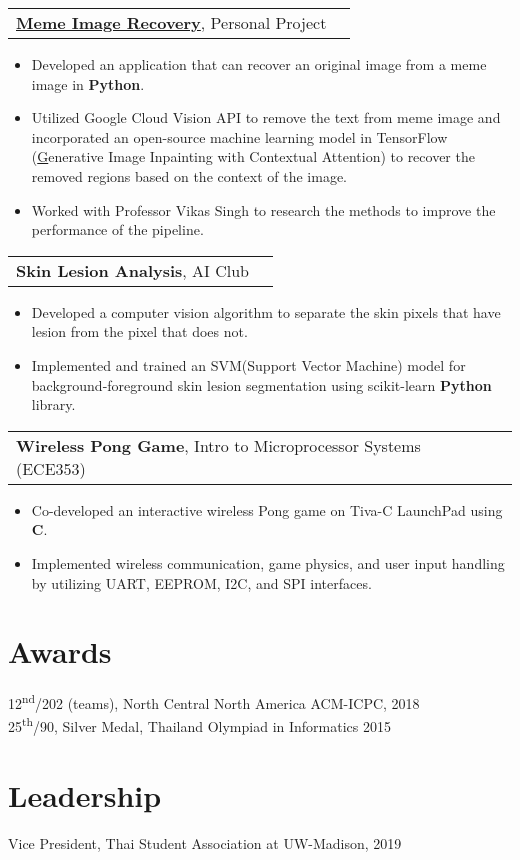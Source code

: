 \documentclass[letterpaper,11pt]{article}
\makeatletter
\newcommand{\resumeSubHeadingListStart}{\begin{itemize}[leftmargin=*,label={}]}
\newcommand{\resumeSubHeadingListEnd}{\end{itemize}}
\newcommand{\projtitle}[2]{
  \vspace{7pt}
  \begin{tabular*}{1.00\textwidth}[t]{l@{\extracolsep{\fill}}r}
    \textbf{#1}, #2 \\
  \end{tabular*}\vspace{-5pt}
}
\newcommand{\expstart}{\begin{itemize}[leftmargin=5mm]}
\newcommand{\expend}{\end{itemize}\vspace{-5pt}}
\newcommand{\expitem}[1]{\item\small{{#1 \vspace{-5pt}}}}
\makeatother
\begin{document}
  \projtitle{\href{https://github.com/newsatit/meme_image_recovery}{Meme Image Recovery}}{Personal Project}
  \expstart
    \expitem{Developed an application that can recover an original image from a meme image in \textbf{Python}.}
    \expitem{Utilized Google Cloud Vision API  to remove the text from meme image and incorporated an open-source machine learning model in TensorFlow (\href{https://github.com/JiahuiYu/generative_inpainting}Generative Image Inpainting with Contextual Attention) to recover the removed regions based on the context of the image.}
    \expitem{Worked with Professor Vikas Singh to research the methods to improve the performance of the pipeline.}
  \expend
  
  
  \projtitle{Skin Lesion Analysis}{AI Club}
  \expstart
    \expitem{Developed a computer vision algorithm to separate the skin pixels that have lesion from the pixel that does not.}
    \expitem{Implemented and trained an SVM(Support Vector Machine) model for background-foreground skin lesion segmentation using scikit-learn \textbf{Python} library.}
  \expend
  
  \projtitle{Wireless Pong Game}{Intro to Microprocessor Systems (ECE353)}
  \expstart
    \expitem{Co-developed an interactive wireless Pong game on Tiva-C LaunchPad using \textbf{C}. }
    \expitem{Implemented wireless communication, game physics, and user input handling by utilizing UART, EEPROM, I2C, and SPI interfaces.}
  \expend
  
\section{Awards}
  12\textsuperscript{nd}/202 (teams), North Central North America ACM-ICPC, 2018 \\
  25\textsuperscript{th}/90, Silver Medal, Thailand Olympiad in Informatics 2015 \vspace{-2pt}
  
\section{Leadership}
   Vice President, Thai Student Association at UW-Madison, 2019
   

%


\end{document}
